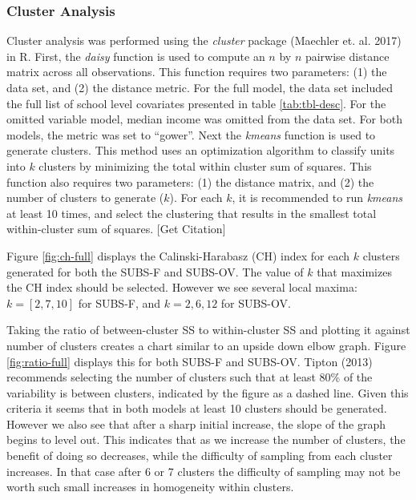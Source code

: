 \documentclass[floatsintext,man]{apa6}
\theoremstyle{definition}
\theoremstyle{definition}
\theoremstyle{definition}
\theoremstyle{remark}
\begin{document}
\subsubsection{Cluster Analysis}\label{cluster-analysis-1}

Cluster analysis was performed using the \emph{cluster} package
(Maechler et. al. 2017) in R. First, the \emph{daisy} function is used
to compute an \(n\) by \(n\) pairwise distance matrix across all
observations. This function requires two parameters: (1) the data set,
and (2) the distance metric. For the full model, the data set included
the full list of school level covariates presented in table
\ref{tab:tbl-desc}. For the omitted variable model, median income was
omitted from the data set. For both models, the metric was set to
\enquote{gower}. Next the \emph{kmeans} function is used to generate
clusters. This method uses an optimization algorithm to classify units
into \(k\) clusters by minimizing the total within cluster sum of
squares. This function also requires two parameters: (1) the distance
matrix, and (2) the number of clusters to generate (\(k\)). For each
\(k\), it is recommended to run \emph{kmeans} at least 10 times, and
select the clustering that results in the smallest total within-cluster
sum of squares. {[}Get Citation{]}

Figure \ref{fig:ch-full} displays the Calinski-Harabasz (CH) index for
each \(k\) clusters generated for both the SUBS-F and SUBS-OV. The value
of \(k\) that maximizes the CH index should be selected. However we see
several local maxima: \(k = [2, 7, 10]\) for SUBS-F, and
\(k = 2, 6, 12\) for SUBS-OV.

Taking the ratio of between-cluster SS to within-cluster SS and plotting
it against number of clusters creates a chart similar to an upside down
elbow graph. Figure \ref{fig:ratio-full} displays this for both SUBS-F
and SUBS-OV. Tipton (2013) recommends selecting the number of clusters
such that at least 80\% of the variability is between clusters,
indicated by the figure as a dashed line. Given this criteria it seems
that in both models at least 10 clusters should be generated. However we
also see that after a sharp initial increase, the slope of the graph
begins to level out. This indicates that as we increase the number of
clusters, the benefit of doing so decreases, while the difficulty of
sampling from each cluster increases. In that case after 6 or 7 clusters
the difficulty of sampling may not be worth such small increases in
homogeneity within clusters.
\end{document}
